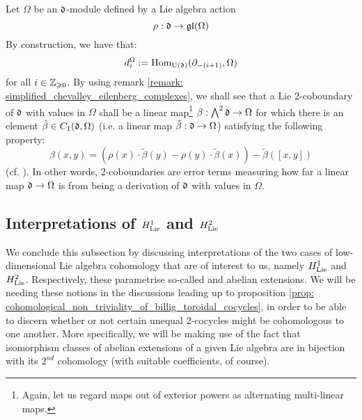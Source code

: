         \begin{example} \label{example: low_degree_lie_coboundaries_with_non_trivial_coefficients}
            Let $\Omega$ be an $\mathfrak{d}$-module defined by a Lie algebra action
                $$\rho: \mathfrak{d} \to \mathfrak{gl}(\Omega)$$
            By construction, we have that:
                $$d_i^\Omega := \mathrm{Hom}_{\mathrm{U}(\mathfrak{d})}(\partial_{-(i + 1)}, \Omega)$$
            for all $i \in \mathbb{Z}_{\geqslant 0}$. By using remark \ref{remark: simplified_chevalley_eilenberg_complexes}, we shall see that a Lie $2$-coboundary of $\mathfrak{d}$ with values in $\Omega$ shall be a linear map\footnote{Again, let us regard maps out of exterior powers as alternating multi-linear maps.} $\beta: \bigwedge^2 \mathfrak{d} \to \Omega$ for which there is an element $\tilde{\beta} \in C_1(\mathfrak{d}, \Omega)$ (i.e. a linear map $\tilde{\beta}: \mathfrak{d} \to \Omega$) satisfying the following property:
                $$\beta(x, y) = \left( \rho(x) \cdot \tilde{\beta}(y) - \rho(y) \cdot \tilde{\beta}(x) \right) - \tilde{\beta}([x, y])$$
            (cf. \cite[Equation 1.6, p. 421]{kassel_quantum_groups}). In other words, $2$-coboundaries are error terms measuring how far a linear map $\mathfrak{d} \to \Omega$ is from being a derivation of $\mathfrak{d}$ with values in $\Omega$.
        \end{example}

    \subsection{Interpretations of \texorpdfstring{$H^1_{\mathrm{Lie}}$}{} and \texorpdfstring{$H^2_{\mathrm{Lie}}$}{}}
        We conclude this subsection by discussing interpretations of the two cases of low-dimensional Lie algebra cohomology that are of interest to us, namely $H^1_{\mathrm{Lie}}$ and $H^2_{\mathrm{Lie}}$. Respectively, these parametrise so-called  and abelian extensions. We will be needing these notions in the discussions leading up to proposition \ref{prop: cohomological_non_triviality_of_billig_toroidal_cocycles}, in order to be able to discern whether or not certain unequal $2$-cocycles might be cohomologous to one another. More specifically, we will be making use of the fact that isomorphism classes of abelian extensions of a given Lie algebra are in bijection with its $2^{nd}$ cohomology (with suitable coefficients, of course).
        
